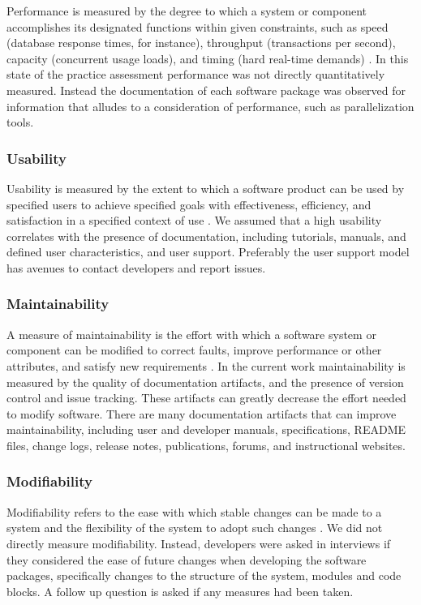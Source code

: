 \documentclass[final, 3p, times, authoryear]{elsarticle}
\begin{document}
Performance is measured by the degree to which a system or component
accomplishes its designated functions within given constraints, such as speed
(database response times, for instance), throughput (transactions per second),
capacity (concurrent usage loads), and timing (hard real-time demands)
\citep{IEEEStdGlossarySET1990, wiegers2003softreq}. In this state of the
practice assessment performance was not directly quantitatively measured.
Instead the documentation of each software package was observed for information
that alludes to a consideration of performance, such as parallelization tools. 

\subsubsection{Usability}

Usability is measured by the extent to which a software product can be used by
specified users to achieve specified goals with effectiveness, efficiency, and
satisfaction in a specified context of use \citep{nielsonusability}. We assumed
that a high usability correlates with the presence of documentation,
including tutorials, manuals, and defined user characteristics, and user
support. Preferably the user support model has avenues to contact developers and
report issues.

\subsubsection{Maintainability}

A measure of maintainability is the effort with which a software system or
component can be modified to correct faults, improve performance or other
attributes, and satisfy new requirements \citep{IEEEStdGlossarySET1990,
boehm2007software}. In the current work maintainability is measured by the
quality of documentation artifacts, and the presence of version control and
issue tracking. These artifacts can greatly decrease the effort needed to modify
software. There are many documentation artifacts that can improve
maintainability, including user and developer manuals, specifications, README
files, change logs, release notes, publications, forums, and instructional
websites. 

\subsubsection{Modifiability}

Modifiability refers to the ease with which stable changes can be made to a
system and the flexibility of the system to adopt such changes \citep{8016712}.
We did not directly measure modifiability. Instead, developers were asked in
interviews if they considered the ease of future changes when developing the
software packages, specifically changes to the structure of the system, modules
and code blocks. A follow up question is asked if any measures had been taken.
\end{document}
